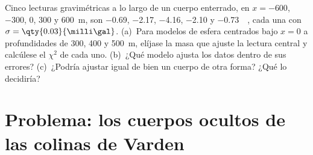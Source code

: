 \begin{exercise}[$\star\star\star$]\label{exo:b3:field-lab-methods-3:12}
Cinco lecturas gravimétricas a lo largo de un cuerpo enterrado, en $x = -600$, $-300$, $0$,
$300$ y \qty{600}{m}, son \num{-0.69}, \num{-2.17}, \num{-4.16},
\num{-2.10} y \qty{-0.73}{\milli\gal}, cada una con $\sigma =
\qty{0.03}{\milli\gal}$. (a)~Para modelos de esfera centrados bajo $x = 0$ a
profundidades de \num{300}, \num{400} y \qty{500}{m}, elíjase la masa que
ajuste la lectura central y calcúlese el  $\chi^2$ de cada uno. (b)~¿Qué
modelo ajusta los datos dentro de sus errores? (c)~¿Podría ajustar igual de bien un cuerpo de otra
forma? ¿Qué lo decidiría?
\end{exercise}

\section{Problema: los cuerpos ocultos de las colinas de Varden}

